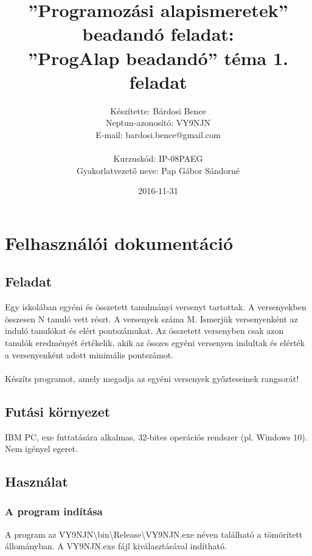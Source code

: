 \documentclass{article}
\title{”Programozási alapismeretek”\\ beadandó feladat:\\ ”ProgAlap beadandó” téma 1. feladat}
\date{2016-11-31}
\author{Készítette: Bárdosi Bence\\ Neptun-azonosító: VY9NJN\\ E-mail: bardosi.bence@gmail.com\\\\ Kurzuskód: IP-08PAEG\\ Gyakorlatvezető neve: Pap Gábor Sándorné}
\begin{document}
  \maketitle
  \newpage

  \tableofcontents
  \newpage

  \section{Felhasználói dokumentáció}
    \subsection{Feladat}
      Egy iskolában egyéni és összetett tanulmányi versenyt tartottak.
      A versenyekben összesen N tanuló vett részt. A versenyek száma M.
      Ismerjük versenyenként az induló tanulókat és elért pontszámukat.
      Az összetett versenyben csak azon tanulók eredményét értékelik,
      akik az összes egyéni versenyen indultak és elérték a versenyenként adott minimális pontszámot.
      \\
      \\ Készíts programot, amely megadja az egyéni versenyek győzteseinek rangsorát!
    \subsection{Futási környezet}
      IBM PC, exe futtatására alkalmas, 32-bites operációs rendszer (pl. Windows 10). Nem igényel egeret.
    \subsection{Használat}
      \subsubsection{A program indítása}
        A program az VY9NJN\textbackslash bin\textbackslash Release\textbackslash VY9NJN.exe néven található a tömörített állományban. A VY9NJN.exe fájl kiválasztásával indítható.
\end{document}
